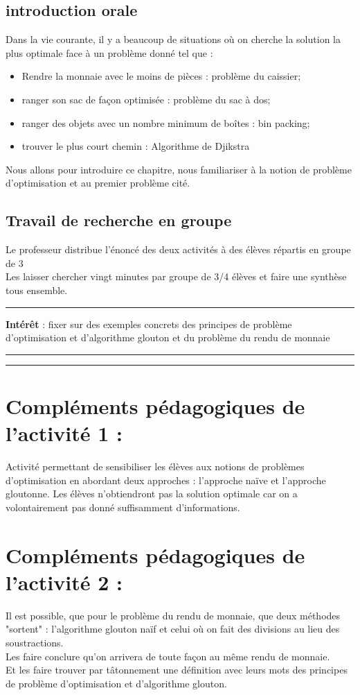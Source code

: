 \documentclass[12pt,french]{report}
\begin{document}
\subsection{\textbf{introduction orale }}
Dans la vie courante, il y  a beaucoup de situations où on cherche la solution la plus optimale face à un problème donné tel que : 
\begin{itemize}[$\bullet$]
	\item Rendre la monnaie avec le moins de pièces : problème du caissier;
	\item  ranger son sac de façon optimisée  : problème du sac à dos;
	\item ranger des objets avec un nombre minimum de boîtes   : bin packing;
	\item trouver le plus court chemin : Algorithme de Djikstra \\
\end{itemize} 
Nous allons pour introduire ce chapitre, nous familiariser à la notion de problème d'optimisation et au premier problème cité.
\subsection{\textbf{Travail de recherche en groupe}}
Le professeur distribue l'énoncé des deux activités à des élèves répartis en groupe de 3\\
Les laisser chercher vingt minutes par groupe de 3/4 élèves et faire une synthèse tous ensemble.\\

\hrule
\bigskip
\textbf{Intérêt} : fixer sur des exemples concrets des principes de problème d'optimisation et d'algorithme glouton et du problème du rendu de monnaie\\
\hrule

\hrule
\begin{center}
	
\end{center} 
\section{Compléments pédagogiques de l'activité 1 :}
Activité permettant de sensibiliser les élèves aux notions de problèmes d'optimisation en abordant deux approches : l'approche naïve et l'approche gloutonne. 
Les élèves n'obtiendront pas la solution optimale car on a volontairement pas donné suffisamment d'informations.
\section{Compléments pédagogiques de l'activité 2 :}
Il est possible, que pour le problème du rendu de monnaie, que deux méthodes "sortent" : l'algorithme glouton naïf et celui où on fait des divisions au lieu des soustractions.\\
Les faire conclure qu'on arrivera de toute façon au même rendu de monnaie.\\
Et les faire trouver par tâtonnement une définition avec leurs mots des principes de problème d'optimisation et d'algorithme glouton.\\

\end{document}
